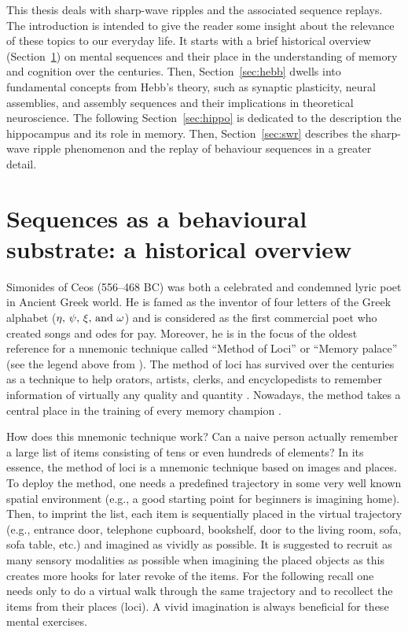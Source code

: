   This thesis deals with sharp-wave ripples and the associated sequence
  replays. The introduction is intended to give the reader some insight about
  the relevance of these topics to our everyday life. It starts with a brief
  historical overview (Section~\ref{sec:seqs}) on mental sequences and their
  place in the understanding of memory and cognition over the centuries. Then,
  Section~\ref{sec:hebb} dwells into fundamental concepts from Hebb's theory,
  such as synaptic plasticity, neural assemblies, and assembly sequences and
  their implications in theoretical neuroscience. The following
  Section~\ref{sec:hippo} is dedicated to the description the hippocampus and
  its role in memory. Then, Section~\ref{sec:swr} describes the sharp-wave
  ripple phenomenon and the replay of behaviour sequences in a greater detail.

\section{Sequences as a behavioural substrate: a historical overview}
\label{sec:seqs}
  Simonides of Ceos (556--468 BC) was both a celebrated and condemned lyric
  poet in Ancient Greek world. He is famed as the inventor of four letters of the
  Greek alphabet ($\eta, \, \psi, \, \xi,\,{\rm and } \,\, \omega$) and is
  considered as the first commercial poet who created songs and odes for pay.
  Moreover, he is in the focus of the oldest reference \citep{Rhetorica} for a
  mnemonic technique called ``Method of Loci'' or ``Memory palace'' (see the legend
  above from \cite{Cicero}). The method of loci has survived over the centuries
  as a technique to help orators, artists, clerks, and encyclopedists to
  remember information of virtually any quality and quantity \citep{Yates66}.
  Nowadays, the method takes a central place in the training of every memory
  champion \citep{Foer2011}.
  
  How does this mnemonic technique work? Can a naive person actually remember a
  large list of items consisting of tens or even hundreds of elements? In its
  essence, the method of loci is a mnemonic technique based on images and
  places. To deploy the method, one needs a predefined trajectory in some very
  well known spatial environment (e.g., a good starting point for beginners is
  imagining home). Then, to imprint the list, each item is sequentially placed
  in the virtual trajectory (e.g., entrance door, telephone cupboard,
  bookshelf, door to the living room, sofa, sofa table, etc.) and imagined as
  vividly as possible. It is suggested to recruit as many sensory modalities as
  possible when imagining the placed objects as this creates more hooks for
  later revoke of the items. For the following recall one needs only to do a
  virtual walk through the same trajectory and to recollect the items from
  their places (loci). A vivid imagination is always beneficial for these
  mental exercises.

